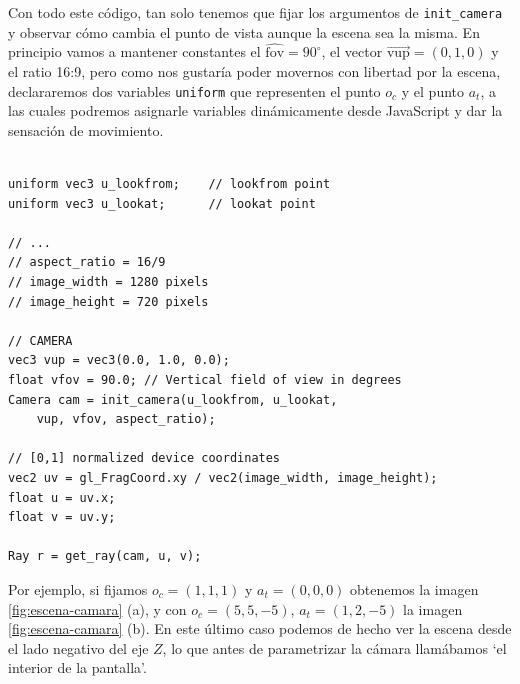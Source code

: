 Con todo este código, tan solo tenemos que fijar los argumentos de \verb|init_camera| y observar cómo cambia el punto de vista aunque la escena sea la misma. En principio vamos a mantener constantes el $\widehat{\mathrm{fov}}=90^\circ$, el vector $\overrightarrow{\mathrm{vup}}=(0,1,0)$ y el ratio 16:9, pero como nos gustaría poder movernos con libertad por la escena, declararemos dos variables \verb|uniform| que representen el punto $o_c$ y el punto $a_t$, a las cuales podremos asignarle variables dinámicamente desde JavaScript y dar la sensación de movimiento.

\begin{lstlisting}

uniform vec3 u_lookfrom;    // lookfrom point
uniform vec3 u_lookat;      // lookat point

// ... 
// aspect_ratio = 16/9
// image_width = 1280 pixels
// image_height = 720 pixels

// CAMERA
vec3 vup = vec3(0.0, 1.0, 0.0);
float vfov = 90.0; // Vertical field of view in degrees
Camera cam = init_camera(u_lookfrom, u_lookat, 
    vup, vfov, aspect_ratio);

// [0,1] normalized device coordinates
vec2 uv = gl_FragCoord.xy / vec2(image_width, image_height);
float u = uv.x;
float v = uv.y;

Ray r = get_ray(cam, u, v);
\end{lstlisting}

Por ejemplo, si fijamos $o_c = (1,1,1)$ y $a_t = (0,0,0)$ obtenemos la imagen \ref{fig:escena-camara} (a), y con $o_c=(5, 5, -5)$, $a_t=(1,2,-5)$ la imagen \ref{fig:escena-camara} (b). En este último caso podemos de hecho ver la escena desde el lado negativo del eje $Z$, lo que antes de parametrizar la cámara llamábamos `el interior de la pantalla'.

